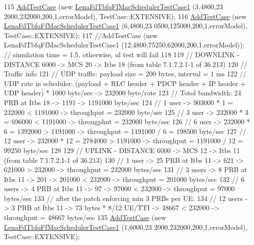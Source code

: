 \begin{DoxyCode}
115   \hyperlink{classns3_1_1TestCase_a3718088e3eefd5d6454569d2e0ddd835}{AddTestCase} (\textcolor{keyword}{new} \hyperlink{classLenaFdTbfqFfMacSchedulerTestCase1}{LenaFdTbfqFfMacSchedulerTestCase1} (3,4800,23
      2000,232000,200,1,errorModel), TestCase::EXTENSIVE);
116   \hyperlink{classns3_1_1TestCase_a3718088e3eefd5d6454569d2e0ddd835}{AddTestCase} (\textcolor{keyword}{new} \hyperlink{classLenaFdTbfqFfMacSchedulerTestCase1}{LenaFdTbfqFfMacSchedulerTestCase1} (6,4800,23
      0500,125000,200,1,errorModel), TestCase::EXTENSIVE);
117   \textcolor{comment}{//AddTestCase (new LenaFdTbfqFfMacSchedulerTestCase1 (12,4800,75250,62000,200,1,errorModel)); //
       simulation time = 1.5, otherwise, ul test will fail}
118 
119   \textcolor{comment}{// DOWNLINK - DISTANCE 6000 -> MCS 20 -> Itbs 18 (from table 7.1.7.2.1-1 of 36.213)}
120   \textcolor{comment}{// Traffic info}
121   \textcolor{comment}{//   UDP traffic: payload size = 200 bytes, interval = 1 ms}
122   \textcolor{comment}{//   UDP rate in scheduler: (payload + RLC header + PDCP header + IP header + UDP header) * 1000 byte/sec
       -> 232000 byte/rate }
123   \textcolor{comment}{// Totol bandwidth: 24 PRB at Itbs 18 -> 1191 -> 1191000 byte/sec}
124   \textcolor{comment}{// 1 user -> 903000 * 1 = 232000 < 1191000 -> throughput = 232000 byte/sec}
125   \textcolor{comment}{// 3 user -> 232000 * 3 = 696000 < 1191000 -> througphut = 232000 byte/sec}
126   \textcolor{comment}{// 6 user -> 232000 * 6 = 1392000 > 1191000 -> throughput = 1191000 / 6 = 198500 byte/sec}
127   \textcolor{comment}{// 12 user -> 232000 * 12 = 2784000 > 1191000 -> throughput =  1191000 / 12 = 99250 byte/sec}
128 
129   \textcolor{comment}{// UPLINK - DISTANCE 6000 -> MCS 12 -> Itbs 11 (from table 7.1.7.2.1-1 of 36.213)}
130   \textcolor{comment}{// 1 user -> 25 PRB at Itbs 11 -> 621 -> 621000 > 232000 -> throughput = 232000 bytes/sec}
131   \textcolor{comment}{// 3 users -> 8 PRB at Itbs 11 -> 201 -> 201000 < 232000 -> throughput = 201000  bytes/sec}
132   \textcolor{comment}{// 6 users -> 4 PRB at Itbs 11 -> 97 -> 97000 < 232000 -> throughput = 97000 bytes/sec}
133   \textcolor{comment}{// after the patch enforcing min 3 PRBs per UE:}
134   \textcolor{comment}{// 12 users -> 3 PRB at Itbs 11 -> 73 bytes * 8/12 UE/TTI -> 48667 < 232000 -> throughput = 48667
       bytes/sec}
135   \hyperlink{classns3_1_1TestCase_a3718088e3eefd5d6454569d2e0ddd835}{AddTestCase} (\textcolor{keyword}{new} \hyperlink{classLenaFdTbfqFfMacSchedulerTestCase1}{LenaFdTbfqFfMacSchedulerTestCase1} (1,6000,23
      2000,232000,200,1,errorModel), TestCase::EXTENSIVE);

\end{DoxyCode}
